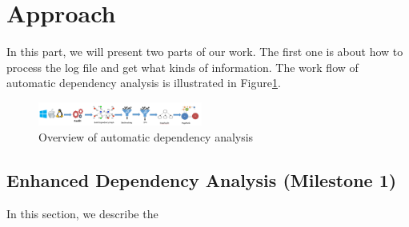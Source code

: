 \section{Approach}
In this part, we will present two parts of our work. The first one is about how to process the log file and get what kinds of information. The work flow of automatic dependency analysis is illustrated in Figure\ref{fig:steps}.
\begin{figure}[!htp]
	\centering

	\includegraphics[width=0.48\textwidth]{figFlow.png}
	\caption{Overview of automatic dependency analysis}
	\label{fig:steps}
\end{figure}

\subsection{Enhanced Dependency Analysis (Milestone 1)}
In this section, we describe the 


